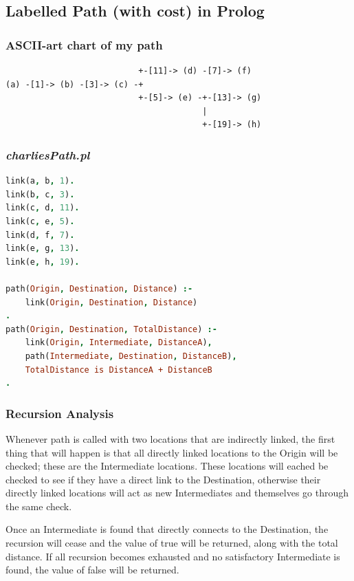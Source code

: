 \documentclass[12pt]{article}
\begin{document}
	\subsection{Labelled Path (with cost) in Prolog}
	\subsubsection{ASCII-art chart of my path}
	\begin{lstlisting}
                           +-[11]-> (d) -[7]-> (f)
(a) -[1]-> (b) -[3]-> (c) -+
                           +-[5]-> (e) -+-[13]-> (g)
                                        |
                                        +-[19]-> (h)
	\end{lstlisting}

	\subsubsection{\textit{charliesPath.pl}}
	\begin{lstlisting}[language = Prolog, tabsize = 8]
link(a, b, 1).
link(b, c, 3).
link(c, d, 11).
link(c, e, 5).
link(d, f, 7).
link(e, g, 13).
link(e, h, 19).

path(Origin, Destination, Distance) :-
	link(Origin, Destination, Distance)
.
path(Origin, Destination, TotalDistance) :-
	link(Origin, Intermediate, DistanceA),
	path(Intermediate, Destination, DistanceB),
	TotalDistance is DistanceA + DistanceB
.
	\end{lstlisting}

	\subsubsection{Recursion Analysis}
	Whenever path is called with two locations that are indirectly linked, the first thing that will happen is that all directly linked locations to the Origin will be checked; these are the Intermediate locations. These locations will eached be checked to see if they have a direct link to the Destination, otherwise their directly linked locations will act as new Intermediates and themselves go through the same check. \linebreak

	Once an Intermediate is found that directly connects to the Destination, the recursion will cease and the value of true will be returned, along with the total distance. If all recursion becomes exhausted and no satisfactory Intermediate is found, the value of false will be returned.
	\pagebreak
\end{document}
